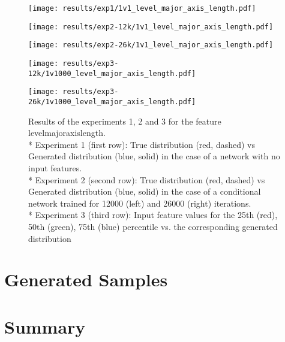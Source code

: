 \begin{figure}[h!]
	\begin{minipage}{0.5\linewidth}
		\texttt{[image: results/exp1/1v1\_level\_major\_axis\_length.pdf]}
	\end{minipage}
	
	\begin{minipage}{0.5\linewidth}
		\texttt{[image: results/exp2-12k/1v1\_level\_major\_axis\_length.pdf]}
	\end{minipage}
	\begin{minipage}{0.5\linewidth}
		\texttt{[image: results/exp2-26k/1v1\_level\_major\_axis\_length.pdf]}
	\end{minipage}
	
	\begin{minipage}{0.5\linewidth}
		\texttt{[image: results/exp3-12k/1v1000\_level\_major\_axis\_length.pdf]}
	\end{minipage}
	\begin{minipage}{0.5\linewidth}
		\texttt{[image: results/exp3-26k/1v1000\_level\_major\_axis\_length.pdf]}
	\end{minipage}
	\caption[ Results: Input feature level\textunderscore major\textunderscore axis\textunderscore length]{ Results of the experiments 1, 2 and 3 for the feature level\textunderscore major\textunderscore axis\textunderscore length. \\* Experiment 1 (first row): True distribution (red, dashed) vs Generated distribution (blue, solid) in the case of a network with no input features. \\* Experiment 2 (second row): True distribution (red, dashed) vs Generated distribution (blue, solid) in the case of a conditional network trained for 12000 (left) and 26000 (right) iterations. \\* Experiment 3 (third row): Input feature values for the 25th (red), 50th (green), 75th (blue) percentile vs. the corresponding generated distribution}
	\label{fig:results_level_major_axis_length}
\end{figure}






\section{Generated Samples}
\section{Summary}